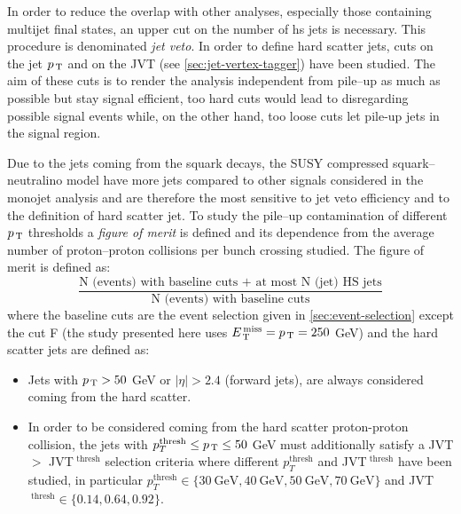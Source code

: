 In order to reduce the overlap with other analyses, especially those containing
multijet final states, an upper cut on the number of \gls{hs} jets is
necessary. This procedure is denominated \emph{jet veto}. In order to define
hard scatter jets, cuts on the jet $p_\mathrm{\, T}$ and on the JVT (see
\cref{sec:jet-vertex-tagger}) have been studied. The aim of these cuts is to
render the analysis independent from pile--up as much as possible but stay
signal efficient, too hard cuts would lead to disregarding possible signal
events while, on the other hand, too loose cuts let pile-up jets in the signal
region.

Due to the jets coming from the squark decays, the SUSY compressed
squark--neutralino model have more jets compared to other signals considered in
the monojet analysis and are therefore the most sensitive to jet veto efficiency
and to the definition of hard scatter jet. To study the pile--up contamination
of different $p_\mathrm{\, T}$ thresholds a \emph{figure of merit} is defined and its
dependence from the average number of proton--proton collisions per bunch
crossing studied. The figure of merit is defined as:
\begin{equation}
  \label{eq:fig_merit}
  \frac{\text{N (events) with baseline cuts + at
      most N (jet) HS jets}}{\text{N (events)
      with baseline cuts}}
\end{equation}
where the baseline cuts are the event selection given in
\cref{sec:event-selection} except the cut F (the study presented here uses
$E_\mathrm{\, T}^\mathrm{\, miss} = p_\mathrm{\, T} = 250$ GeV) and the hard scatter jets are defined as:
\begin{itemize}
\item Jets with $p_\mathrm{\, T} > 50$ GeV or $|\eta| > 2.4$ (forward jets), are always
  considered coming from the hard scatter.
\item In order to be considered coming from the hard scatter proton-proton
  collision, the jets with $p_T^{\text{thresh}} \leq p_\mathrm{\, T} \leq 50$ GeV must
  additionally satisfy a JVT $>$ JVT$^{\text{ thresh}}$ selection criteria where
  different $p_T^{\text{thresh}}$ and JVT$^{\text{ thresh}}$ have been studied,
  in particular
  $p_T^{\text{thresh}} \in \{30~\text{GeV}, 40~\text{GeV}, 50~\text{GeV},
  70~\text{GeV}\}$ and JVT$^{\text{ thresh}} \in \{0.14, 0.64, 0.92\}$.
\end{itemize}


